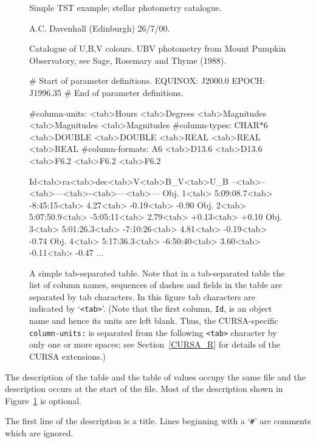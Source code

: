 \documentclass[twoside,11pt,nolof,chapters]{starlink}
\begin{document}
\begin{figure}[htbp]


\begin{terminalv}
Simple TST example; stellar photometry catalogue.

A.C. Davenhall (Edinburgh) 26/7/00.

Catalogue of U,B,V colours.
UBV photometry from Mount Pumpkin Observatory,
see Sage, Rosemary and Thyme (1988).

# Start of parameter definitions.
EQUINOX: J2000.0
EPOCH: J1996.35
# End of parameter definitions.

#column-units: <tab>Hours <tab>Degrees <tab>Magnitudes <tab>Magnitudes <tab>Magnitudes
#column-types: CHAR*6 <tab>DOUBLE <tab>DOUBLE <tab>REAL <tab>REAL <tab>REAL
#column-formats: A6 <tab>D13.6 <tab>D13.6 <tab>F6.2 <tab>F6.2 <tab>F6.2

Id<tab>ra<tab>dec<tab>V<tab>B_V<tab>U_B
--<tab>--<tab>---<tab>-<tab>---<tab>---
Obj. 1<tab> 5:09:08.7<tab> -8:45:15<tab>  4.27<tab>  -0.19<tab>  -0.90
Obj. 2<tab> 5:07:50.9<tab> -5:05:11<tab>  2.79<tab>  +0.13<tab>  +0.10
Obj. 3<tab> 5:01:26.3<tab> -7:10:26<tab>  4.81<tab>  -0.19<tab>  -0.74
Obj. 4<tab> 5:17:36.3<tab> -6:50:40<tab>  3.60<tab>  -0.11<tab>  -0.47
...
\end{terminalv}

\begin{quote}
\caption[A simple tab-separated table.]{A simple tab-separated table.
Note that in a tab-separated table the list of column names, sequences of
dashes and fields in the table are separated by tab characters.  In this
figure tab characters are indicated by `\texttt{<tab>}'.  (Note that the
first column, \texttt{Id}, is an object name and hence its units are left
blank.  Thus, the CURSA-specific \texttt{column-units:} is separated from
the following \texttt{<tab>} character by only one or more spaces; see
Section~\ref{CURSA_R} for details of the CURSA extensions.)
\label{TSTEXAMP} }
\end{quote}

\end{figure}

The description of the table and the table of values occupy the same
file and the description occurs at the start of the file.  Most of the
description shown in Figure~\ref{TSTEXAMP} is optional.

The first line of the description is a title.  Lines beginning with a
`\texttt{\#}' are comments which are ignored.
\end{document}
